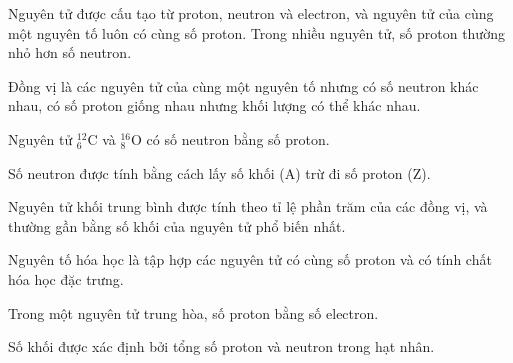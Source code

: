 \def\writeANS{\TLdung{A}\TLsai{B}\TLdung{C}\TLdung{D}}
\begin{loigiaiex}{25}
  Nguyên tử được cấu tạo từ proton, neutron và electron, và nguyên tử của cùng một nguyên tố luôn có cùng số proton. Trong nhiều nguyên tử, số proton thường nhỏ hơn số neutron.  \phantom {a}\hfill { \faKey ~\writeANS }
\end{loigiaiex}
\def\writeANS{\TLdung{C}\TLdung{D}}
\begin{loigiaiex}{26}
  Đồng vị là các nguyên tử của cùng một nguyên tố nhưng có số neutron khác nhau, có số proton giống nhau nhưng khối lượng có thể khác nhau.  \phantom {a}\hfill { \faKey ~\writeANS }
\end{loigiaiex}
\def\writeANS{\TLdung{C}\TLsai{D}}
\begin{loigiaiex}{27}
  Nguyên tử $^{12}_{6}\text {C}$ và $^{16}_{8}\text {O}$ có số neutron bằng số proton.  \phantom {a}\hfill { \faKey ~\writeANS }
\end{loigiaiex}
\def\writeANS{\TLdung{B}\TLsai{C}\TLsai{D}}
\begin{loigiaiex}{28}
  Số neutron được tính bằng cách lấy số khối (A) trừ đi số proton (Z).  \phantom {a}\hfill { \faKey ~\writeANS }
\end{loigiaiex}
\def\writeANS{\TLsai{A}\TLsai{C}\TLdung{D}}
\begin{loigiaiex}{29}
  Nguyên tử khối trung bình được tính theo tỉ lệ phần trăm của các đồng vị, và thường gần bằng số khối của nguyên tử phổ biến nhất.  \phantom {a}\hfill { \faKey ~\writeANS }
\end{loigiaiex}
\def\writeANS{\TLdung{A}\TLsai{B}\TLdung{C}\TLsai{D}}
\begin{loigiaiex}{30}
  Nguyên tố hóa học là tập hợp các nguyên tử có cùng số proton và có tính chất hóa học đặc trưng.  \phantom {a}\hfill { \faKey ~\writeANS }
\end{loigiaiex}
\def\writeANS{\TLdung{C}\TLsai{D}}
\begin{loigiaiex}{31}
  Trong một nguyên tử trung hòa, số proton bằng số electron.  \phantom {a}\hfill { \faKey ~\writeANS }
\end{loigiaiex}
\def\writeANS{\TLdung{C}\TLsai{D}}
\begin{loigiaiex}{32}
  Số khối được xác định bởi tổng số proton và neutron trong hạt nhân.  \phantom {a}\hfill { \faKey ~\writeANS }
\end{loigiaiex}
\def\writeANS{\TLsai{C}\TLdung{D}}

